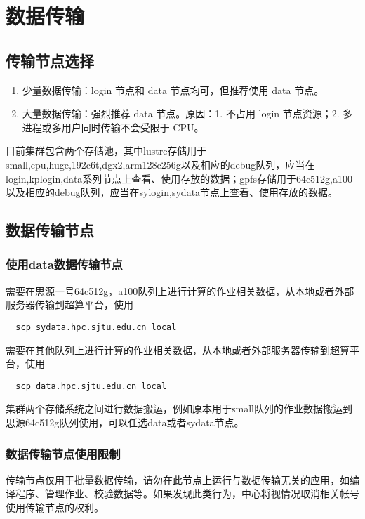 \documentclass[cn, 12pt, hang, black, chinese]{elegantbook}
\begin{document}
\chapter{数据传输}

\section{传输节点选择}
\begin{enumerate}
\item 少量数据传输：login 节点和 data 节点均可，但推荐使用 data 节点。
\item 大量数据传输：强烈推荐 data 节点。原因：1. 不占用 login 节点资源；2. 多进程或多用户同时传输不会受限于 CPU。
\end{enumerate}

    目前集群包含两个存储池，其中lustre存储用于small,cpu,huge,192c6t,dgx2,arm128c256g以及相应的debug队列，应当在login,kplogin,data系列节点上查看、使用存放的数据；gpfs存储用于64c512g,a100以及相应的debug队列，应当在sylogin,sydata节点上查看、使用存放的数据。

\section{数据传输节点}

\subsection*{使用data数据传输节点}
需要在思源一号64c512g，a100队列上进行计算的作业相关数据，从本地或者外部服务器传输到超算平台，使用
\begin{lstlisting}
  scp sydata.hpc.sjtu.edu.cn local
\end{lstlisting}

    需要在其他队列上进行计算的作业相关数据，从本地或者外部服务器传输到超算平台，使用
\begin{lstlisting}
  scp data.hpc.sjtu.edu.cn local
\end{lstlisting}

    集群两个存储系统之间进行数据搬运，例如原本用于small队列的作业数据搬运到思源64c512g队列使用，可以任选data或者sydata节点。

\subsection*{数据传输节点使用限制}
传输节点仅用于批量数据传输，请勿在此节点上运行与数据传输无关的应用，如编译程序、管理作业、校验数据等。如果发现此类行为，中心将视情况取消相关帐号使用传输节点的权利。
\end{document}

